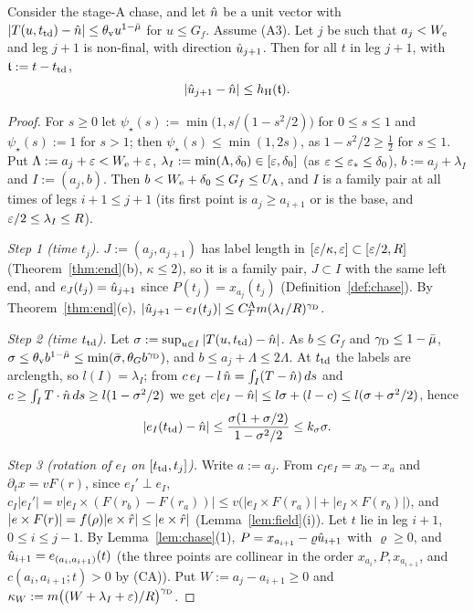 \begin{lemma}[Heading]\label{lem:heading}
Consider the stage-A chase, and let $\hat n$ be a unit vector with $|T(u,t_{\mathrm{td}})-\hat n|\le\theta_{\mathrm v}u^{1-\bar\mu}$ for $u\le G_f$. Assume
\textup{(A3)}. Let $j$ be such that $a_j<W_{\mathrm e}$ and leg $j+1$ is non-final, with direction $\hat u_{j+1}$. Then for all $t$ in leg
$j+1$, with $\mathfrak t:=t-t_{\mathrm{td}}$,
\[
|\hat u_{j+1}-\hat n|\le h_{\mathrm H}(\mathfrak t).
\]
\end{lemma}

\begin{proof}
For $s\ge0$ let $\psi_\star(s):=\min\bigl(1,s/(1-s^2/2)\bigr)$ for $0\le s\le1$ and $\psi_\star(s):=1$ for $s>1$; then
$\psi_\star(s)\le\min(1,2s)$, as $1-s^2/2\ge\frac12$ for $s\le1$. Put $\Lambda:=a_j+\varepsilon<W_{\mathrm e}+\varepsilon$, $\lambda_I:=\min(\Lambda,\delta_0)\in[\varepsilon,\delta_0]$ (as
$\varepsilon\le\varepsilon_*\le\delta_0$), $b:=a_j+\lambda_I$ and $I:=(a_j,b)$. Then $b<W_{\mathrm e}+\delta_0\le G_f\le U_{\mathrm A}$, and $I$ is a family pair at all
times of legs $i+1\le j+1$ (its first point is $a_j\ge a_{i+1}$ or is the base, and $\varepsilon/2\le\lambda_I\le R$).

\emph{Step 1 (time $t_j$).} $J:=(a_j,a_{j+1})$ has label length in $[\varepsilon/\kappa,\varepsilon]\subset[\varepsilon/2,R]$ (Theorem~\ref{thm:end}(b),
$\kappa\le2$), so it is a family pair, $J\subset I$ with the same left end, and $e_J(t_j)=\hat u_{j+1}$ since $P(t_j)=x_{a_j}(t_j)$
(Definition~\ref{def:chase}). By Theorem~\ref{thm:end}(c), $|\hat u_{j+1}-e_I(t_j)|\le C_T^{\mathrm A}m(\lambda_I/R)^{\gamma_{\mathrm D}}$.

\emph{Step 2 (time $t_{\mathrm{td}}$).} Let $\sigma:=\sup_{u\in I}|T(u,t_{\mathrm{td}})-\hat n|$. As $b\le G_f$ and $\gamma_{\mathrm D}\le1-\bar\mu$,
$\sigma\le\theta_{\mathrm v}b^{1-\bar\mu}\le\min(\bar\sigma,\theta_Gb^{\gamma_{\mathrm D}})$, and $b\le a_j+\Lambda\le2\Lambda$. At $t_{\mathrm{td}}$ the labels are
arclength, so $l(I)=\lambda_I$; from $c\,e_I-l\,\hat n=\int_I(T-\hat n)\,ds$ and $c\ge\int_IT\cdot\hat n\,ds\ge l(1-\sigma^2/2)$ we get
$c|e_I-\hat n|\le l\sigma+(l-c)\le l(\sigma+\sigma^2/2)$, hence
\[
|e_I(t_{\mathrm{td}})-\hat n|\le\frac{\sigma(1+\sigma/2)}{1-\sigma^2/2}\le k_\sigma\sigma .
\]

\emph{Step 3 (rotation of $e_I$ on $[t_{\mathrm{td}},t_j]$).} Write $a:=a_j$. From $c_Ie_I=x_b-x_a$ and $\partial_tx=vF(r)$, since $e_I'\perp e_I$,
$c_I|e_I'|=v|e_I\times(F(r_b)-F(r_a))|\le v\bigl(|e_I\times F(r_a)|+|e_I\times F(r_b)|\bigr)$, and
$|e\times F(r)|=f(\rho)|e\times\hat r|\le|e\times\hat r|$ (Lemma~\ref{lem:field}(i)). Let $t$ lie in leg $i+1$, $0\le i\le j-1$. By
Lemma~\ref{lem:chase}(1), $P=x_{a_{i+1}}-\varrho\hat u_{i+1}$ with $\varrho\ge0$, and $\hat u_{i+1}=e_{(a_i,a_{i+1})}(t)$ (the three points
are collinear in the order $x_{a_i},P,x_{a_{i+1}}$, and $c(a_i,a_{i+1};t)>0$ by (CA)). Put $W:=a_j-a_{i+1}\ge0$ and
$\kappa_W:=m\bigl((W+\lambda_I+\varepsilon)/R\bigr)^{\gamma_{\mathrm D}}$.


\end{proof}
